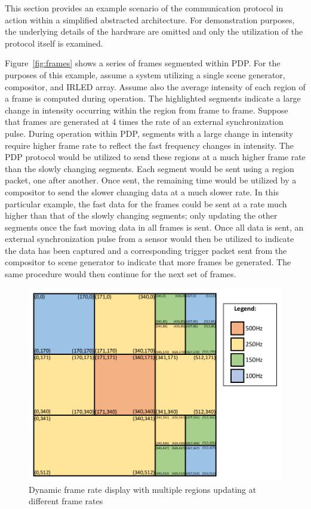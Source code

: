 This section provides an example scenario of the communication protocol in action within a simplified abstracted architecture. For demonstration purposes, the underlying details of the hardware are omitted and only the utilization of the protocol itself is examined.

Figure~\ref{fig:frames} shows a series of frames segmented within PDP. For the purposes of this example, assume a system utilizing a single scene generator, compositor, and IRLED array. Assume also the average intensity of each region of a frame is computed during operation. The highlighted segments indicate a large change in intensity occurring within the region from frame to frame. Suppose that frames are generated at 4 times the rate of an external synchronization pulse. During operation within PDP, segments with a large change in intensity require higher frame rate to reflect the fast frequency changes in intensity. The PDP protocol would be utilized to send these regions at a much higher frame rate than the slowly changing segments. Each segment would be sent using a region packet, one after another. Once sent, the remaining time would be utilized by a compositor to send the slower changing data at a much slower rate. In this particular example, the fast data for the frames could be sent at a rate much higher than that of the slowly changing segments; only updating the other segments once the fast moving data in all frames is sent. Once all data is sent, an external synchronization pulse from a sensor would then be utilized to indicate the data has been captured and a corresponding trigger packet sent from the compositor to scene generator to indicate that more frames be generated. The same procedure would then continue for the next set of frames.

\begin{figure}
    \centering
        \centering
        \includegraphics[width=1.0\textwidth]{fig/variable_display.pdf}
        \caption{Dynamic frame rate display with multiple regions updating at different frame rates}
        \label{fig:variable_display}
\end{figure}

